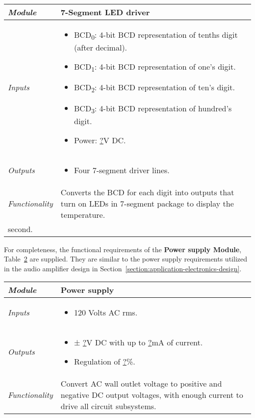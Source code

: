 \begin{table}[h]
\label{table:digitalThermoSevenSeg}
\begin{tabular}{|l|m{10cm}|}
\hline
\emph{Module} & 7-Segment LED driver\\ \hline
\emph{Inputs} & 
\begin{itemize}
\item
  BCD\textsubscript{0}: 4-bit BCD representation of tenths digit (after
  decimal).
\item
  BCD\textsubscript{1}: 4-bit BCD representation of one's digit.
\item
  BCD\textsubscript{2}: 4-bit BCD representation of ten's digit.
\item
  BCD\textsubscript{3}: 4-bit BCD representation of hundred's digit.
\item
  Power: \ul{?}V DC.
\end{itemize}  \\ \hline
\emph{Outputs} & 
\begin{itemize}
\item
  Four 7-segment driver lines.
\end{itemize}\\ \hline
\emph{Functionality} & Converts the BCD for each digit into outputs that
turn on LEDs in 7-segment package to display the temperature. \\
second. \\ \hline
\end{tabular}
\end{table}



For completeness, the functional requirements of
the \textbf{Power supply Module}, 
Table~\ref{table:digitalThermoPowerSupply} are supplied. 
They are similar to the power supply requirements utilized in
the audio amplifier design in Section~\ref{section:application-electronics-design}.


\begin{table}[h]
\label{table:digitalThermoPowerSupply}
\begin{tabular}{|l|m{10cm}|}
\hline
\emph{Module} & Power supply\\ \hline

\emph{Inputs} & 
\begin{itemize}
\item  120 Volts AC rms.
\end{itemize} \\ \hline

\emph{Outputs} & 
\begin{itemize}
\item  ± \ul{?}V DC with up to \ul{?}mA of current.
\item  Regulation of \ul{?}\%.
\end{itemize}\\ \hline

\emph{Functionality} & Convert AC wall outlet voltage to positive and
negative DC output voltages, with enough current to drive all circuit
subsystems. \\ \hline

\end{tabular}
\end{table}




